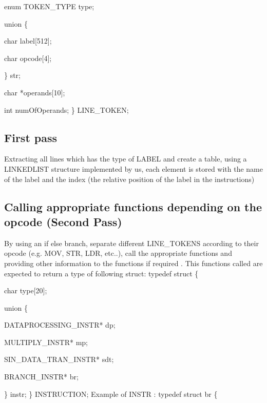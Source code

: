 \documentclass[11pt]{article}
\begin{document}
   enum TOKEN{\_}TYPE type;
   
   union \{
      
\hspace{0.5cm} char label[512];

\hspace{0.5cm} char opcode[4];
  
   \} str;
  
   char *operands[10];
   
   int numOfOperands;\newline   
\} LINE{\_}TOKEN;

\subsection{First pass}
Extracting all lines which has the type of LABEL and create a table, using a LINKEDLIST structure implemented by us, each element is stored with the name of the label and the index (the relative position of the label in the instructions)
\subsection{Calling appropriate functions depending on the opcode (Second Pass)}
By using an if else branch, separate different LINE{\_}TOKENS according to their opcode (e.g. MOV, STR, LDR, etc..), call the appropriate functions and providing other information to the functions if required . This functions called are expected to return a type of following struct: \newline\newline
typedef struct \{
     
   char type[20];
   
   union \{
      
\hspace{0.5cm} DATAPROCESSING{\_}INSTR* dp; 
       

\hspace{0.5cm} MULTIPLY{\_}INSTR* mp;

\hspace{0.5cm} SIN{\_}DATA{\_}TRAN{\_}INSTR* sdt;

\hspace{0.5cm} BRANCH{\_}INSTR* br;
  
   \} instr;\newline   
\} INSTRUCTION;\newline\newline
Example of INSTR :\newline\newline
typedef struct br \{
   
\end{document}
